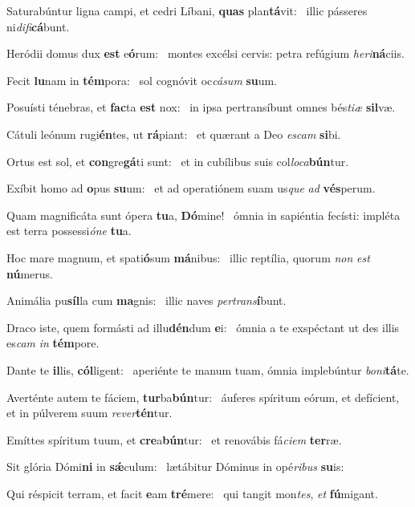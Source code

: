 \item Saturabúntur ligna campi, et cedri Líbani, \textbf{quas} plan\textbf{tá}vit:~\psstar{} illic pásseres ni\textit{difi}\textbf{cá}bunt.
\item Heródii domus dux \textbf{est} e\textbf{ó}rum:~\psstar{} montes excélsi cervis: petra refúgium \textit{heri}\textbf{ná}ciis.
\item Fecit \textbf{lu}nam in \textbf{tém}pora:~\psstar{} sol cognóvit oc\textit{cásum} \textbf{su}um.
\item Posuísti ténebras, et \textbf{fac}ta \textbf{est} nox:~\psstar{} in ipsa pertransíbunt omnes bés\textit{tiæ} \textbf{sil}væ.
\item Cátuli leónum rugi\textbf{én}tes, ut \textbf{rá}piant:~\psstar{} et quærant a Deo \textit{escam} \textbf{si}bi.
\item Ortus est sol, et \textbf{con}gre\textbf{gá}ti sunt:~\psstar{} et in cubílibus suis col\textit{loca}\textbf{bún}tur.
\item Exíbit homo ad \textbf{o}pus \textbf{su}um:~\psstar{} et ad operatiónem suam us\textit{que} \textit{ad} \textbf{vés}perum.
\item Quam magnificáta sunt ópera \textbf{tu}a, \textbf{Dó}mine!~\psstar{} ómnia in sapiéntia fecísti: impléta est terra possessi\textit{óne} \textbf{tu}a.
\item Hoc mare magnum, et spati\textbf{ó}sum \textbf{má}nibus:~\psstar{} illic reptília, quorum \textit{non} \textit{est} \textbf{nú}merus.
\item Animália pu\textbf{síl}la cum \textbf{ma}gnis:~\psstar{} illic naves \textit{pertrans}\textbf{í}bunt.
\item Draco iste, quem formásti ad illu\textbf{dén}dum \textbf{e}i:~\psstar{} ómnia a te exspéctant ut des illis es\textit{cam} \textit{in} \textbf{tém}pore.
\item Dante te \textbf{il}lis, \textbf{cól}ligent:~\psstar{} aperiénte te manum tuam, ómnia implebúntur \textit{boni}\textbf{tá}te.
\item Averténte autem te fáciem, \textbf{tur}ba\textbf{bún}tur:~\psstar{} áuferes spíritum eórum, et defícient, et in púlverem suum \textit{rever}\textbf{tén}tur.
\item Emíttes spíritum tuum, et \textbf{cre}a\textbf{bún}tur:~\psstar{} et renovábis fá\textit{ciem} \textbf{ter}ræ.
\item Sit glória Dómi\textbf{ni} in \textbf{sǽ}culum:~\psstar{} lætábitur Dóminus in opé\textit{ribus} \textbf{su}is:
\item Qui réspicit terram, et facit \textbf{e}am \textbf{tré}mere:~\psstar{} qui tangit mon\textit{tes}, \textit{et} \textbf{fú}migant.
